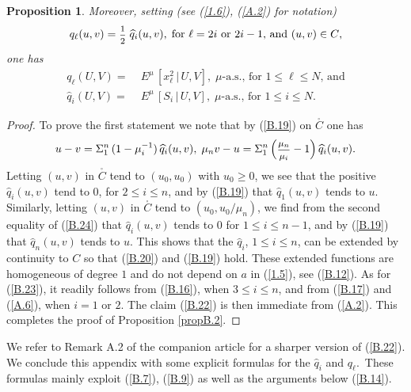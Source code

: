 \documentclass[12pt,leqno]{article}
\def\dis{\displaystyle}
\def\fr{\mbox{\footnotesize $\dis\frac{1}{2}$}}
\def\f{\footnotesize}
\def\wh{\widehat}
\newtheorem{proposition}[theorem]{Proposition}
\begin{document}
\begin{appendix}
\begin{proposition}
\medskip
Moreover, setting (see {\rm (\ref{1.6})}, {\rm (\ref{A.2})} for notation)
\begin{equation}\label{B.21}
q_\ell (u,v) = \fr \; \wh{q}_i (u,v), \; \mbox{for $\ell = 2i$ or $2i-1$, and $(u,v) \in C$},
\end{equation}
one has
\begin{align}
q_\ell (U,V) = &\; \mbox{$E^\mu\,[x_\ell^2 \, | \, U,V], \; \mu$-a.s., for $1 \le \ell \le N$, and} \label{B.22}
\\[1ex]
\wh{q}_i (U,V) = &\; \mbox{$E^\mu\,[S_i \, | \, U,V], \; \mu$-a.s., for $1 \le i \le N$}. \label{B.23}
\end{align}
\end{proposition}

\begin{proof}
To prove the first statement we note that by (\ref{B.19}) on $\stackrel{_\circ}{C}$ one has
\begin{equation}\label{B.24}
u - v = \Sigma^n_1 \,(1-\mu_i^{-1}) \, \wh{q}_i(u,v), \; \mu_n v - u = \Sigma^n_1 \, \Big(\mbox{\f $\dis\frac{\mu_n}{\mu_i}$} - 1\Big) \, \wh{q}_i(u,v).
\end{equation}
Letting $(u,v)$ in $\stackrel{_\circ}{C}$ tend to $(u_0,u_0)$ with $u_0 \ge 0$, we see that the positive $\wh{q}_i (u,v)$ tend to $0$, for $2 \le i \le n$, and by (\ref{B.19}) that $\wh{q}_1(u,v)$ tends to $u$. Similarly, letting $(u,v)$ in $\stackrel{_\circ}{C}$ tend to $(u_0, u_0/\mu_n)$, we find from the second equality of (\ref{B.24}) that $\wh{q}_i (u,v)$ tends to $0$ for $1 \le i \le n-1$, and by (\ref{B.19}) that $\wh{q}_n(u,v)$ tends to $u$. This shows that the $\wh{q}_i$, $1 \le i \le n$, can be extended by continuity to $C$ so that (\ref{B.20}) and (\ref{B.19}) hold. These extended functions are homogeneous of degree $1$ and do not depend on $a$ in (\ref{1.5}), see (\ref{B.12}). As for (\ref{B.23}), it readily follows from (\ref{B.16}), when $3 \le i \le n$, and from (\ref{B.17}) and (\ref{A.6}), when $i = 1$ or $2$. The claim (\ref{B.22}) is then immediate from (\ref{A.2}). This completes the proof of Proposition \ref{propB.2}.
\end{proof}

We refer to Remark A.2 of the companion article \cite{SzniWidm26b} for a sharper version of (\ref{B.22}). We conclude this appendix with some explicit formulas for the $\wh{q}_i$ and $q_\ell$.~These formulas mainly exploit (\ref{B.7}), (\ref{B.9}) as well as the arguments below (\ref{B.14}).


\end{appendix}
\end{document}
